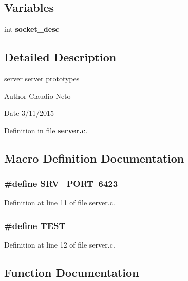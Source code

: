 \subsection*{Variables}
\begin{DoxyCompactItemize}
\item 
int {\bf socket\-\_\-desc}
\end{DoxyCompactItemize}


\subsection{Detailed Description}
server server prototypes \begin{DoxyAuthor}{Author}
Claudio Neto
\end{DoxyAuthor}
\begin{DoxyDate}{Date}
3/11/2015 
\end{DoxyDate}


Definition in file {\bf server.\-c}.



\subsection{Macro Definition Documentation}
\subsubsection[{S\-R\-V\-\_\-\-P\-O\-R\-T}]{\setlength{\rightskip}{0pt plus 5cm}\#define S\-R\-V\-\_\-\-P\-O\-R\-T~6423}\label{server_8c_aee1132b8a79e9a6dd0d19a93f7133389}


Definition at line 11 of file server.\-c.

\subsubsection[{T\-E\-S\-T}]{\setlength{\rightskip}{0pt plus 5cm}\#define T\-E\-S\-T}\label{server_8c_ab946e2e7f7679350627acfded8e2658b}


Definition at line 12 of file server.\-c.



\subsection{Function Documentation}
